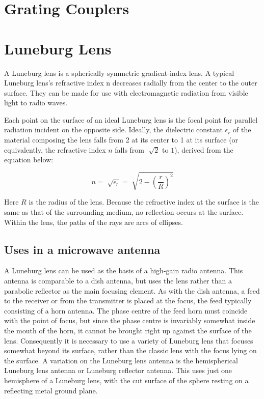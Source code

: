 \documentclass[a4paper,12pt]{report}
\begin{document}
\section{Grating Couplers}

\section{Luneburg Lens}


A Luneburg lens is a spherically symmetric gradient-index lens.
A typical Luneburg lens's refractive index n decreases radially
from the center to the outer surface.
They can be made for use with electromagnetic radiation
from visible light to radio waves.

Each point on the surface of an ideal Luneburg lens is the
focal point for parallel radiation incident on the opposite side.
Ideally, the dielectric constant $\epsilon_r$ of the material
composing the lens falls from 2 at its center to 1 at its surface
(or equivalently, the refractive index $n$ falls from $\sqrt[]{2}$ to $1$),
derived from the equation below:

\begin{equation}
  n = \sqrt[]{\epsilon_r} = \sqrt[]{2 - \left(\frac{r}{R}\right)^2}
\end{equation}

Here $R$ is the radius of the lens.
Because the refractive index at the surface is the same
as that of the surrounding medium,
no reflection occurs at the surface.
Within the lens, the paths of the rays are arcs of ellipses.

\subsection{Uses in a microwave antenna}

A Luneburg lens can be used as the basis of a high-gain radio antenna.
This antenna is comparable to a dish antenna,
but uses the lens rather than a parabolic reflector as the main focusing element.
As with the dish antenna,
a feed to the receiver or from the transmitter is placed at the focus,
the feed typically consisting of a horn antenna.
The phase centre of the feed horn must coincide with the point of focus,
but since the phase centre is invariably somewhat inside the mouth of the horn,
it cannot be brought right up against the surface of the lens.
Consequently it is necessary to use a variety of Luneburg lens
that focuses somewhat beyond its surface,
rather than the classic lens with the focus lying on the surface.
A variation on the Luneburg lens antenna is the hemispherical
Luneburg lens antenna or Luneburg reflector antenna.
This uses just one hemisphere of a Luneburg lens,
with the cut surface of the sphere resting on a reflecting metal ground plane.
\end{document}
